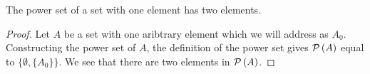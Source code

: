 \documentclass[main.tex]{subfiles}
\begin{document}
\subproblem{}\label{8b}

\begin{thm}[\(\card{A} = 1 \implies \card{\powerset{A}} = 2\)]
	The power set of a set with one element has two elements.
\end{thm}
\begin{proof}
	Let \(A\) be a set with one aribtrary element which we will address as
	\(A_0\). Constructing the power set of \(A\), the definition of the
	power set gives \(\mathcal{P}\left(A\right)\) equal to \(\{\emptyset, \{A_0\}\}\).
	We see that there are two elements in \(\mathcal{P}\left(A\right)\).
\end{proof}
\end{document}
